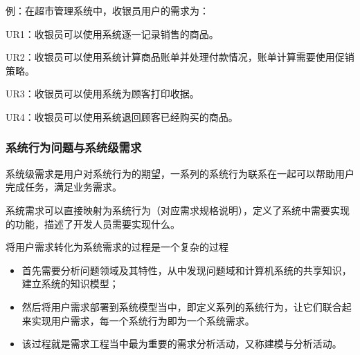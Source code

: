 例：在超市管理系统中，收银员用户的需求为：
\vspace{-0.25em}
{\kaishu \begin{compactitem}
    \item UR1：收银员可以使用系统逐一记录销售的商品。
    \item UR2：收银员可以使用系统计算商品账单并处理付款情况，账单计算需要使用促销策略。
    \item UR3：收银员可以使用系统为顾客打印收据。
    \item UR4：收银员可以使用系统退回顾客已经购买的商品。
\end{compactitem}}
  

\subsubsection{系统行为问题与系统级需求}
系统级需求是用户对系统行为的期望，一系列的系统行为联系在一起可以帮助用户完成任务，满足业务需求。

系统需求可以直接映射为系统行为（对应需求规格说明），定义了系统中需要实现的功能，描述了开发人员需要实现什么。

将用户需求转化为系统需求的过程是一个复杂的过程
\begin{itemize}
    \item 首先需要分析问题领域及其特性，从中发现问题域和计算机系统的共享知识，建立系统的知识模型；
    \item 然后将用户需求部署到系统模型当中，即定义系列的系统行为，让它们联合起来实现用户需求，每一个系统行为即为一个系统需求。
    \item 该过程就是需求工程当中最为重要的需求分析活动，又称建模与分析活动。 
\end{itemize}

